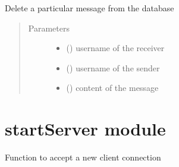 \documentclass[letterpaper,10pt,english]{sphinxmanual}
\begin{document}
\begin{fulllineitems}
\label{\detokenize{db:db.deleteMessage}}
Delete a particular message from the database
\begin{quote}\begin{description}
\item[{Parameters}] \leavevmode\begin{itemize}
\item {} 
 () \textendash{} username of the receiver

\item {} 
 () \textendash{} username of the sender

\item {} 
 () \textendash{} content of the message

\end{itemize}

\end{description}\end{quote}

\end{fulllineitems}



\section{startServer module}
\label{\detokenize{startServer:module-startServer}}\label{\detokenize{startServer:startserver-module}}\label{\detokenize{startServer::doc}}

\begin{fulllineitems}
\label{\detokenize{startServer:startServer.accept}}
Function to accept a new client connection

\end{fulllineitems}
\end{document}
